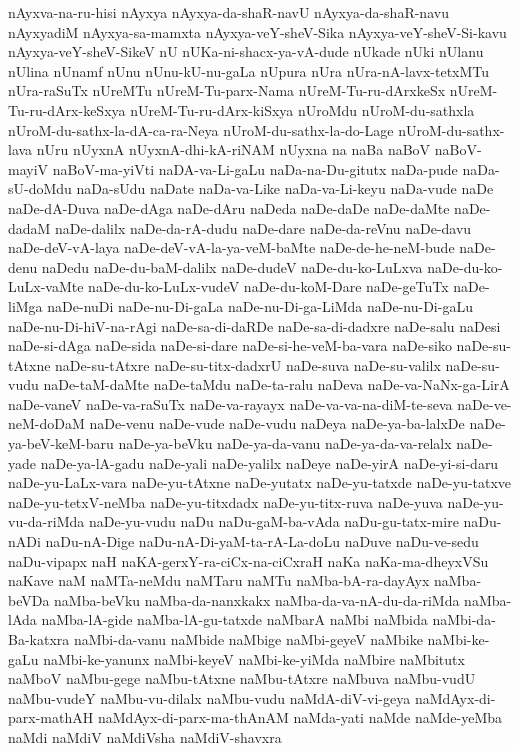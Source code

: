 {nAyxva-na-ru-hisi
nAyxya
nAyxya-da-shaR-navU
nAyxya-da-shaR-navu
nAyxyadiM
nAyxya-sa-mamxta
nAyxya-veY-sheV-Sika
nAyxya-veY-sheV-Si-kavu
nAyxya-veY-sheV-SikeV
nU
nUKa-ni-shacx-ya-vA-dude
nUkade
nUki
nUlanu
nUlina
nUnamf
nUnu
nUnu-kU-nu-gaLa
nUpura
nUra
nUra-nA-lavx-tetxMTu
nUra-raSuTx
nUreMTu
nUreM-Tu-parx-Nama
nUreM-Tu-ru-dArxkeSx
nUreM-Tu-ru-dArx-keSxya
nUreM-Tu-ru-dArx-kiSxya
nUroMdu
nUroM-du-sathxla
nUroM-du-sathx-la-dA-ca-ra-Neya
nUroM-du-sathx-la-do-Lage
nUroM-du-sathx-lava
nUru
nUyxnA
nUyxnA-dhi-kA-riNAM
nUyxna
na
naBa
naBoV
naBoV-mayiV
naBoV-ma-yiVti
naDA-va-Li-gaLu
naDa-na-Du-gitutx
naDa-pude
naDa-sU-doMdu
naDa-sUdu
naDate
naDa-va-Like
naDa-va-Li-keyu
naDa-vude
naDe
naDe-dA-Duva
naDe-dAga
naDe-dAru
naDeda
naDe-daDe
naDe-daMte
naDe-dadaM
naDe-dalilx
naDe-da-rA-dudu
naDe-dare
naDe-da-reVnu
naDe-davu
naDe-deV-vA-laya
naDe-deV-vA-la-ya-veM-baMte
naDe-de-he-neM-bude
naDe-denu
naDedu
naDe-du-baM-dalilx
naDe-dudeV
naDe-du-ko-LuLxva
naDe-du-ko-LuLx-vaMte
naDe-du-ko-LuLx-vudeV
naDe-du-koM-Dare
naDe-geTuTx
naDe-liMga
naDe-nuDi
naDe-nu-Di-gaLa
naDe-nu-Di-ga-LiMda
naDe-nu-Di-gaLu
naDe-nu-Di-hiV-na-rAgi
naDe-sa-di-daRDe
naDe-sa-di-dadxre
naDe-salu
naDesi
naDe-si-dAga
naDe-sida
naDe-si-dare
naDe-si-he-veM-ba-vara
naDe-siko
naDe-su-tAtxne
naDe-su-tAtxre
naDe-su-titx-dadxrU
naDe-suva
naDe-su-valilx
naDe-su-vudu
naDe-taM-daMte
naDe-taMdu
naDe-ta-ralu
naDeva
naDe-va-NaNx-ga-LirA
naDe-vaneV
naDe-va-raSuTx
naDe-va-rayayx
naDe-va-va-na-diM-te-seva
naDe-ve-neM-doDaM
naDe-venu
naDe-vude
naDe-vudu
naDeya
naDe-ya-ba-lalxDe
naDe-ya-beV-keM-baru
naDe-ya-beVku
naDe-ya-da-vanu
naDe-ya-da-va-relalx
naDe-yade
naDe-ya-lA-gadu
naDe-yali
naDe-yalilx
naDeye
naDe-yirA
naDe-yi-si-daru
naDe-yu-LaLx-vara
naDe-yu-tAtxne
naDe-yutatx
naDe-yu-tatxde
naDe-yu-tatxve
naDe-yu-tetxV-neMba
naDe-yu-titxdadx
naDe-yu-titx-ruva
naDe-yuva
naDe-yu-vu-da-riMda
naDe-yu-vudu
naDu
naDu-gaM-ba-vAda
naDu-gu-tatx-mire
naDu-nADi
naDu-nA-Dige
naDu-nA-Di-yaM-ta-rA-La-doLu
naDuve
naDu-ve-sedu
naDu-vipapx
naH
naKA-gerxY-ra-ciCx-na-ciCxraH
naKa
naKa-ma-dheyxVSu
naKave
naM
naMTa-neMdu
naMTaru
naMTu
naMba-bA-ra-dayAyx
naMba-beVDa
naMba-beVku
naMba-da-nanxkakx
naMba-da-va-nA-du-da-riMda
naMba-lAda
naMba-lA-gide
naMba-lA-gu-tatxde
naMbarA
naMbi
naMbida
naMbi-da-Ba-katxra
naMbi-da-vanu
naMbide
naMbige
naMbi-geyeV
naMbike
naMbi-ke-gaLu
naMbi-ke-yanunx
naMbi-keyeV
naMbi-ke-yiMda
naMbire
naMbitutx
naMboV
naMbu-gege
naMbu-tAtxne
naMbu-tAtxre
naMbuva
naMbu-vudU
naMbu-vudeY
naMbu-vu-dilalx
naMbu-vudu
naMdA-diV-vi-geya
naMdAyx-di-parx-mathAH
naMdAyx-di-parx-ma-thAnAM
naMda-yati
naMde
naMde-yeMba
naMdi
naMdiV
naMdiVsha
naMdiV-shavxra
}
